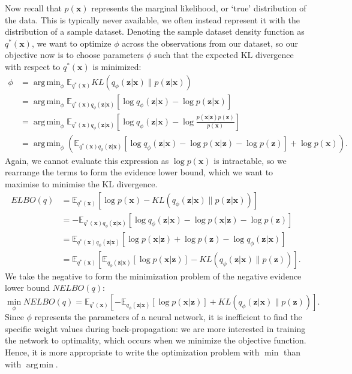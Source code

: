 \documentclass[honours,12pt]{unswthesis}
\newcommand{\E}{\mathbb{E}}
\DeclareMathOperator*{\argmin}{arg\,min}
\numberwithin{equation}{section}
\theoremstyle{definition}
\begin{document}
Now recall that $p(\bm{x})$ represents the marginal likelihood, or `true' distribution of the data. This is typically never available, we often instead represent it with the distribution of a sample dataset. Denoting the sample dataset density function as $q^*(\bm{x})$, we want to optimize $\phi$ across the observations from our dataset, so our objective now is to choose parameters $\phi$ such that the expected KL divergence with respect to $q^*(\bm{x})$ is minimized:
\begin{align*}
\phi &=\argmin_\phi \mathbb{E}_{q^*(\bm{x})}KL(q_\phi(\bm{z}|\bm{x})\|p(\bm{z}|\bm{x}))\\
&= \argmin_\phi \mathbb{E}_{q^*(\bm{x})q_\phi (\bm{z}|\bm{x})}\left[\log q_\phi(\bm{z}|\bm{x})-\log p(\bm{z}|\bm{x})\right]\\
&=\argmin_\phi\mathbb{E}_{q^*(\bm{x})q_\phi (\bm{z}|\bm{x})}\left[\log q_\phi(\bm{z}|\bm{x})-\log \frac{p(\bm{x}|\bm{z})p(\bm{z})}{p(\bm{x})}\right]\\
&=\argmin_\phi\left(\mathbb{E}_{q^*(\bm{x})q_\phi (\bm{z}|\bm{x})}\left[\log q_\phi(\bm{z}|\bm{x})-\log p(\bm{x}|\bm{z})-\log p(\bm{z})\right]+\log p(\bm{x})\right).
\end{align*} 
Again, we cannot evaluate this expression as $\log p(\bm{x})$ is intractable, so we rearrange the terms to form the evidence lower bound, which we want to maximise to minimise the KL divergence.
\begin{align*}
ELBO(q)&=\mathbb{E}_{q^*(\bm{x})}[\log p(\bm{x})-KL(q_\phi(\bm{z}|\bm{x})\|p(\bm{z}|\bm{x}))]\\
&=-\mathbb{E}_{q^*(\bm{x})q_\phi(\bm{z}|\bm{x})}\left[\log q_\phi(\bm{z}|\bm{x})-\log p(\bm{x}|\bm{z})-\log p(\bm{z})\right]\\
&=\mathbb{E}_{q^*(\bm{x})q_\phi(\bm{z}|\bm{x})}\left[\log p(\bm{x}|\bm{z})+\log p(\bm{z})-\log q_\phi(\bm{z}|\bm{x})\right]\\
&=\mathbb{E}_{q^*(\bm{x})}\left[\E_{q_\phi(\bm{z}|\bm{x})}[\log p(\bm{x}|\bm{z})]-KL(q_\phi(\bm{z}|\bm{x})\|p(\bm{z}))\right].
\end{align*}
We take the negative to form the minimization problem of the negative evidence lower bound $NELBO(q)$:
\begin{equation}
\min_\phi NELBO(q)=\mathbb{E}_{q^*(\bm{x})}\left[-\E_{q_\phi(\bm{z}|\bm{x})}[\log p(\bm{x}|\bm{z})]+KL(q_\phi(\bm{z}|\bm{x})\|p(\bm{z}))\right].
\end{equation}
Since $\phi$ represents the parameters of a neural network, it is inefficient to find the specific weight values during back-propagation: we are more interested in training the network to optimality, which occurs when we minimize the objective function. Hence, it is more appropriate to write the optimization problem with $\min$ than with $\argmin$.
\end{document}
